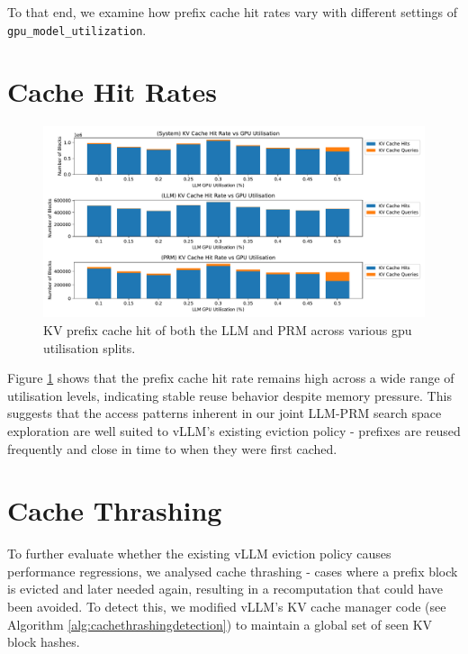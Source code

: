 \documentclass[11pt,twoside]{report}
\begin{document}
To that end, we examine how prefix cache hit rates vary with different settings of \texttt{gpu\_model\_utilization}.

\section{Cache Hit Rates}
\begin{figure}[htbp]
\centering
\includegraphics[width=\textwidth]{figures/kv_cache_hit_rate.pdf}
\caption{KV prefix cache hit of both the LLM and PRM across various gpu utilisation splits.}
\label{fig:kv_cache_hit_rate}
\end{figure}

Figure \ref{fig:kv_cache_hit_rate} shows that the prefix cache hit rate remains high across a wide range of utilisation levels, indicating stable reuse behavior despite memory pressure. 
This suggests that the access patterns inherent in our joint LLM-PRM search space exploration are well suited to vLLM's existing eviction policy - prefixes are reused frequently and close in time to when they were first cached.

\section{Cache Thrashing}
To further evaluate whether the existing vLLM eviction policy causes performance regressions, we analysed cache thrashing - cases where a prefix block is evicted and later needed again, resulting in a recomputation that could have been avoided. 
To detect this, we modified vLLM's KV cache manager code (see Algorithm \ref{alg:cachethrashingdetection}) to maintain a global set of seen KV block hashes. 
\end{document}
